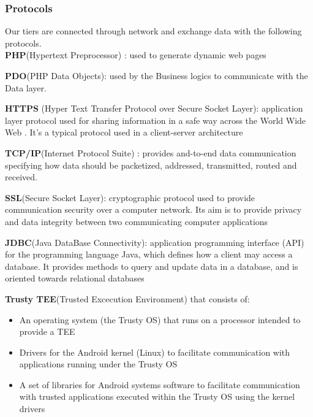 \documentclass{article}
\begin{document}
\begin{flushleft}
\subsubsection{Protocols}
Our tiers are connected through network and exchange data with the following protocols.
\vspace{1cm}
\\

\textbf{PHP}(Hypertext Preprocessor) : used to generate dynamic web pages\break\break

\textbf{PDO}(PHP Data Objects): used by the Business logics to communicate with the Data layer. \break\break

\textbf{HTTPS} (Hyper Text Transfer Protocol over Secure Socket Layer): application layer protocol used for sharing information in a safe way across the World Wide Web . It's a typical protocol used in a client-server architecture\break\break

\textbf{TCP/IP}(Internet Protocol Suite) : provides and-to-end data communication specifying how data should be packetized, addressed, transmitted, routed and received.\break\break

\textbf{SSL}(Secure Socket Layer): cryptographic protocol used to provide communication security over a computer network. Its aim is to provide privacy and data integrity between two communicating computer applications\break\break

\textbf{JDBC}(Java DataBase Connectivity): application programming interface (API) for the programming language Java, which defines how a client may access a database. It provides methods to query and update data in a database, and is oriented towards relational databases \break\break

\textbf{Trusty TEE}(Trusted Excecution Environment) that consists of:
\begin{itemize}
\item An operating system (the Trusty OS) that runs on a processor intended to provide a TEE
\item Drivers for the Android kernel (Linux) to facilitate communication with applications running under the Trusty OS
\item A set of libraries for Android systems software to facilitate communication with trusted applications executed within the Trusty OS using the kernel drivers

\end{itemize} 
\vspace{1cm}




\end{flushleft}
\end{document}
